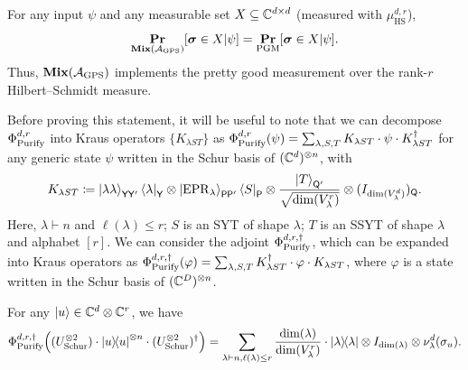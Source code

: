 \begin{proposition} \label{prop:base_implements_pgm}
    For any input $\psi$ and any measurable set $X \subseteq \mathbb C^{d\times d}$ (measured with $\mu_{\mathrm{HS}}^{d,r}$), 
    \begin{equation*}
        \mathop{\bf Pr\/}_{\textup{\textbf{Mix}}(\mathcal{A}_{\mathrm{GPS}})}[ \boldsymbol{\sigma} \in X| \psi ] = \mathop{\bf Pr\/}_{\mathrm{PGM}} [ \boldsymbol{\sigma} \in X| \psi].
    \end{equation*}
    Thus, $\textup{\textbf{Mix}}(\mathcal{A}_{\mathrm{GPS}})$ implements the pretty good measurement over the rank-$r$ Hilbert--Schmidt measure. 
\end{proposition}

Before proving this statement, it will be useful to note that we can decompose $\Phi_{\mathrm{Purify}}^{d,r}$ into Kraus operators $\{K_{\lambda S T}\}$ as $\Phi_{\mathrm{Purify}}^{d,r}(\psi) = \sum_{\lambda, S, T} K_{\lambda S T} \cdot \psi \cdot K_{\lambda S T}^\dagger$ for any generic state $\psi$ written in the Schur basis of $(\mathbb C^d)^{\otimes n}$, with
\begin{equation}
        K_{\lambda S T} \coloneq \ket{\lambda \lambda}_{\mathsf{YY'}}\bra{\lambda}_{\mathsf{Y}} \otimes \ket{\mathrm{EPR}_\lambda}_{\mathsf{PP'}}\bra{S}_{\mathsf{P}} \otimes \frac{\ket{T}_{\mathsf{Q'}}}{\sqrt{\dim(V^r_\lambda)}} \otimes (I_{\dim(V^d_\lambda)})_{\mathsf{Q}} . \label{eq:kraus_purifychan}
\end{equation}
Here, $\lambda \vdash n$ and $\ell(\lambda) \leq r$; $S$ is an SYT of shape $\lambda$; $T$ is an SSYT of shape $\lambda$ and alphabet $[r]$. We can consider the adjoint $\Phi_{\mathrm{Purify}}^{d,r,\dagger}$, which can be expanded into Kraus operators as $\Phi_{\mathrm{Purify}}^{d,r,\dagger}(\varphi) = \sum_{\lambda,S,T} K_{\lambda S T}^\dagger \cdot \varphi \cdot K_{\lambda S T}$, where $\varphi$ is a state written in the Schur basis of $(\mathbb C^D)^{\otimes n}$.

\begin{lemma} \label{lem:purifychan_adjoint_on_n_fold_u}
    For any $\ket{u} \in \mathbb C^{d} \otimes \mathbb C^r$, we have
    \begin{equation*}\Phi_{\mathrm{Purify}}^{d,r,\dagger} \Big( (U_{\mathrm{Schur}}^{\otimes 2}) \cdot \ketbra{u}^{\otimes n} \cdot (U_{\mathrm{Schur}}^{\otimes 2})^\dagger \Big) = \sum_{\lambda \vdash n, \ell(\lambda)\leq r} \frac{\dim(\lambda)}{\dim(V^r_\lambda)} \cdot \ketbra{\lambda} \otimes I_{\dim(\lambda)} \otimes \nu^d_\lambda(\sigma_u).\end{equation*}
\end{lemma}

